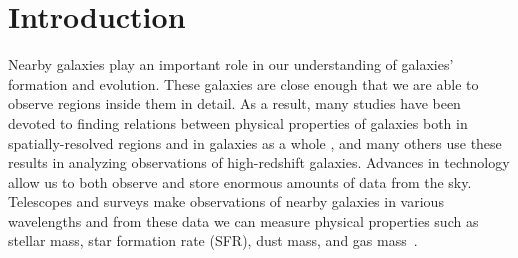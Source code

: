 \section{Introduction} %

Nearby galaxies play an important role in our understanding of galaxies' formation and evolution.
These galaxies are close enough that we are able to observe regions inside them in detail.
As a result, many studies have been devoted to finding relations between physical properties of galaxies both in spatially-resolved regions and in galaxies as a whole%
, and many others use these results in analyzing observations of high-redshift galaxies. %
Advances in technology allow us to both observe and store enormous amounts of data from the sky.%
Telescopes and surveys make observations of nearby galaxies in various wavelengths and from these data we can measure physical properties such as stellar mass, star formation rate (SFR), dust mass, and gas mass~\citep[e.g.[]{Calzetti07,Dale09,Eskew12}.


